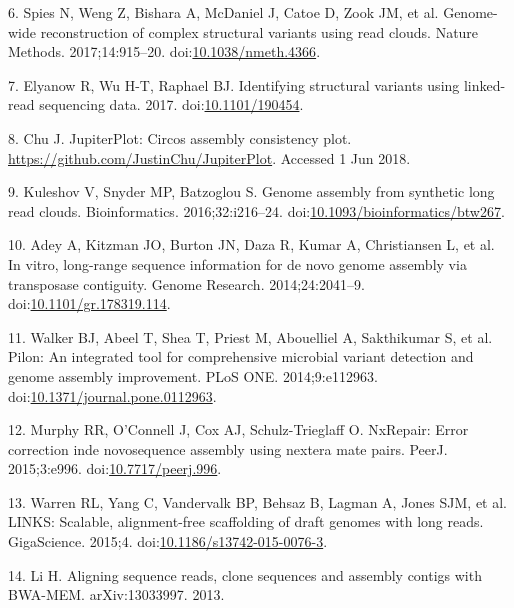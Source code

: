 \documentclass{bmcart}
\begin{document}
\begin{backmatter}
\leavevmode\hypertarget{ref-Spies_2017}{}%
6. Spies N, Weng Z, Bishara A, McDaniel J, Catoe D, Zook JM, et al. Genome-wide reconstruction of complex structural variants using read clouds. Nature Methods. 2017;14:915--20. doi:\href{https://doi.org/10.1038/nmeth.4366}{10.1038/nmeth.4366}.

\leavevmode\hypertarget{ref-Elyanow_2017}{}%
7. Elyanow R, Wu H-T, Raphael BJ. Identifying structural variants using linked-read sequencing data. 2017. doi:\href{https://doi.org/10.1101/190454}{10.1101/190454}.

\leavevmode\hypertarget{ref-URL_Topsorter}{}%
8. Chu J. JupiterPlot: Circos assembly consistency plot. \url{https://github.com/JustinChu/JupiterPlot}. Accessed 1 Jun 2018.

\leavevmode\hypertarget{ref-Kuleshov_2016}{}%
9. Kuleshov V, Snyder MP, Batzoglou S. Genome assembly from synthetic long read clouds. Bioinformatics. 2016;32:i216--24. doi:\href{https://doi.org/10.1093/bioinformatics/btw267}{10.1093/bioinformatics/btw267}.

\leavevmode\hypertarget{ref-Adey_2014}{}%
10. Adey A, Kitzman JO, Burton JN, Daza R, Kumar A, Christiansen L, et al. In vitro, long-range sequence information for de novo genome assembly via transposase contiguity. Genome Research. 2014;24:2041--9. doi:\href{https://doi.org/10.1101/gr.178319.114}{10.1101/gr.178319.114}.

\leavevmode\hypertarget{ref-Walker_2014}{}%
11. Walker BJ, Abeel T, Shea T, Priest M, Abouelliel A, Sakthikumar S, et al. Pilon: An integrated tool for comprehensive microbial variant detection and genome assembly improvement. PLoS ONE. 2014;9:e112963. doi:\href{https://doi.org/10.1371/journal.pone.0112963}{10.1371/journal.pone.0112963}.

\leavevmode\hypertarget{ref-Murphy_2015}{}%
12. Murphy RR, O'Connell J, Cox AJ, Schulz-Trieglaff O. NxRepair: Error correction inde novosequence assembly using nextera mate pairs. PeerJ. 2015;3:e996. doi:\href{https://doi.org/10.7717/peerj.996}{10.7717/peerj.996}.

\leavevmode\hypertarget{ref-Warren_2015}{}%
13. Warren RL, Yang C, Vandervalk BP, Behsaz B, Lagman A, Jones SJM, et al. LINKS: Scalable, alignment-free scaffolding of draft genomes with long reads. GigaScience. 2015;4. doi:\href{https://doi.org/10.1186/s13742-015-0076-3}{10.1186/s13742-015-0076-3}.

\leavevmode\hypertarget{ref-Li_2013}{}%
14. Li H. Aligning sequence reads, clone sequences and assembly contigs with BWA-MEM. arXiv:13033997. 2013.


\end{backmatter}
\end{document}
